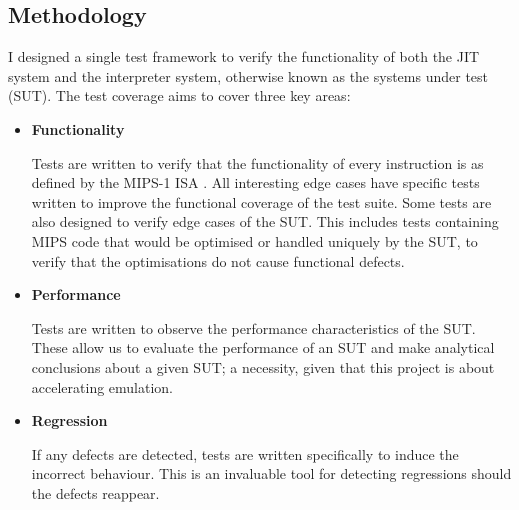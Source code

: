 \subsection{Methodology}

I designed a single test framework to verify the functionality of both the JIT system and the interpreter system, otherwise known as the systems under test (SUT). The test coverage aims to cover three key areas:

\begin{itemize}
    \item \textbf{Functionality}
    
    Tests are written to verify that the functionality of every instruction is as defined by the MIPS-1 ISA \cite{mips-1-isa}. All interesting edge cases have specific tests written to improve the functional coverage of the test suite. Some tests are also designed to verify edge cases of the SUT. This includes tests containing MIPS code that would be optimised or handled uniquely by the SUT, to verify that the optimisations do not cause functional defects.
    
    \item \textbf{Performance}
    
    Tests are written to observe the performance characteristics of the SUT. These allow us to evaluate the performance of an SUT and make analytical conclusions about a given SUT; a necessity, given that this project is about accelerating emulation.
    
    \item \textbf{Regression}
    
    If any defects are detected, tests are written specifically to induce the incorrect behaviour. This is an invaluable tool for detecting regressions should the defects reappear.
\end{itemize}